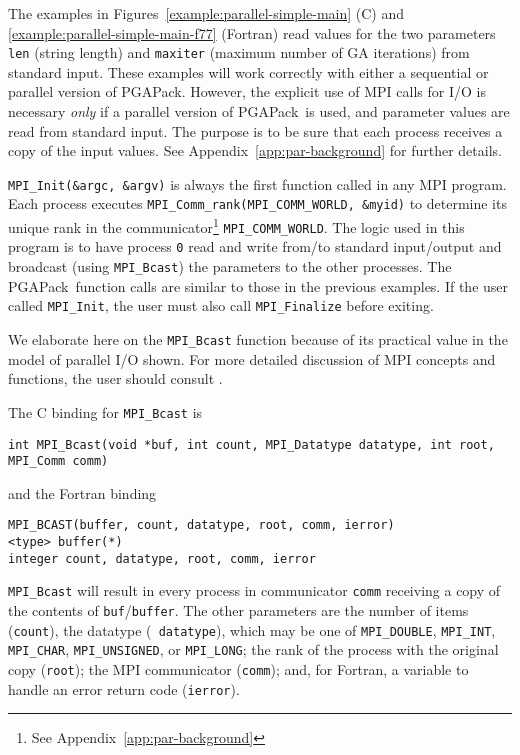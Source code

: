 \documentclass{report}
\newcommand{\pga}{PGAPack}
\begin{document}
The examples in Figures~\ref{example:parallel-simple-main} (C) and
\ref{example:parallel-simple-main-f77} (Fortran)
read values for the two parameters {\tt len} (string length) and {\tt maxiter}
(maximum number of GA iterations) from standard input.  These examples will
work correctly with either a sequential or parallel version of \pga.  However,
the explicit use of MPI calls for I/O is necessary {\em only} if a parallel
version of \pga\ is used, and parameter values are read from standard input.
The purpose is to be sure that each process receives a copy of the input
values.  See Appendix~\ref{app:par-background} for further details.

\begin{sloppypar}
{\tt MPI\_Init(\&argc, \&argv)} is always the first function called in any MPI
program.  Each process executes {\tt MPI\_Comm\_rank(MPI\_COMM\_WORLD,
\&myid)} to determine its unique rank in the communicator\footnote{See
Appendix~\ref{app:par-background}} {\tt MPI\_COMM\_WORLD}.  The logic used in
this program is to have process {\tt 0} read and write from/to standard
input/output and broadcast (using {\tt MPI\_Bcast}) the parameters to the
other processes.  The \pga\ function calls are similar to those in the
previous examples.  If the user called {\tt MPI\_Init}, the user must also
call {\tt MPI\_Finalize} before exiting.
\end{sloppypar}

We elaborate here on the {\tt MPI\_Bcast} function because of its practical
value in the model of parallel I/O shown. For more detailed discussion of MPI
concepts and functions, the user should consult \cite{MPI-final,GrLuSk94}.

The C binding for {\tt MPI\_Bcast} is
\begin{verbatim}
int MPI_Bcast(void *buf, int count, MPI_Datatype datatype, int root, MPI_Comm comm)
\end{verbatim}
and the Fortran binding
\begin{verbatim}
MPI_BCAST(buffer, count, datatype, root, comm, ierror)
<type> buffer(*)
integer count, datatype, root, comm, ierror
\end{verbatim}
{\tt MPI\_Bcast} will result in every process in communicator {\tt comm}
receiving a copy of the contents of {\tt *buf}/{\tt buffer}.  The other
parameters are the number of items ({\tt count}), the datatype ({\tt
datatype}), which may be one of 
{\tt MPI\_DOUBLE},
{\tt MPI\_INT},
{\tt MPI\_CHAR},
{\tt MPI\_UNSIGNED},
or {\tt MPI\_LONG};
the rank of the process with the original copy ({\tt root}); the MPI
communicator ({\tt comm}); and, for Fortran, a variable to handle an error
return code ({\tt ierror}).
\end{document}
